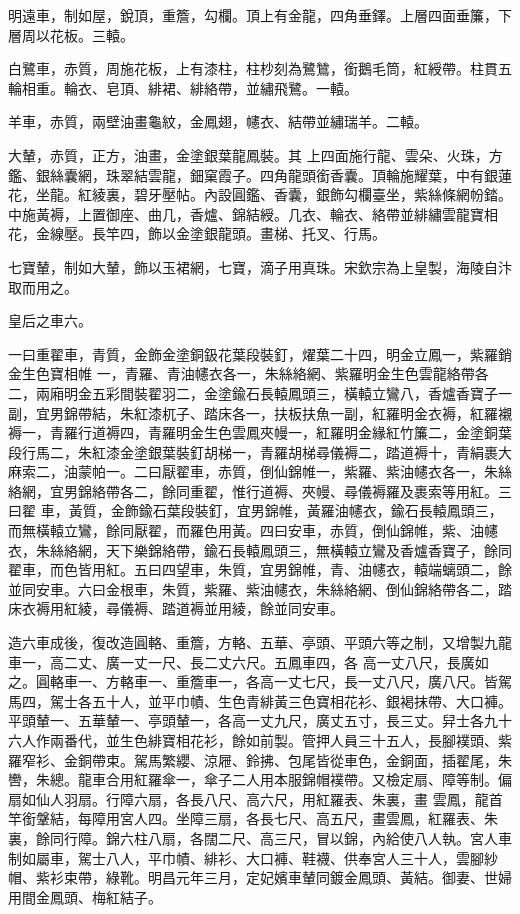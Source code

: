 \begin{pinyinscope}
 明遠車，制如屋，銳頂，重簷，勾欄。頂上有金龍，四角垂鐸。上層四面垂簾，下層周以花板。三轅。



 白鷺車，赤質，周施花板，上有漆柱，柱杪刻為鷺鷥，銜鵝毛筒，紅綬帶。柱貫五輪相重。輪衣、皂頂、緋裙、緋絡帶，並繡飛鷺。一轅。



 羊車，赤質，兩壁油畫龜紋，金鳳翅，幰衣、結帶並繡瑞羊。二轅。



 大輦，赤質，正方，油畫，金塗銀葉龍鳳裝。其
 上四面施行龍、雲朵、火珠，方鑑、銀絲囊網，珠翠結雲龍，鈿窠霞子。四角龍頭銜香囊。頂輪施耀葉，中有銀蓮花，坐龍。紅綾裏，碧牙壓帖。內設圓鑑、香囊，銀飾勾欄臺坐，紫絲條網帉錔。中施黃褥，上置御座、曲几，香爐、錦結綬。几衣、輪衣、絡帶並緋繡雲龍寶相花，金線壓。長竿四，飾以金塗銀龍頭。畫梯、托叉、行馬。



 七寶輦，制如大輦，飾以玉裙網，七寶，滴子用真珠。宋欽宗為上皇製，海陵自汴取而用之。



 皇后之車六。



 一曰重翟車，青質，金飾金塗銅鈒花葉段裝釘，燿葉二十四，明金立鳳一，紫羅銷金生色寶相帷
 一，青羅、青油幰衣各一，朱絲絡網、紫羅明金生色雲龍絡帶各二，兩廂明金五彩間裝翟羽二，金塗鍮石長轅鳳頭三，橫轅立鸞八，香爐香寶子一副，宜男錦帶結，朱紅漆杌子、踏床各一，扶板扶魚一副，紅羅明金衣褥，紅羅襯褥一，青羅行道褥四，青羅明金生色雲鳳夾幔一，紅羅明金緣紅竹簾二，金塗銅葉段行馬二，朱紅漆金塗銀葉裝釘胡梯一，青羅胡梯尋儀褥二，踏道褥十，青絹裹大麻索二，油蒙帕一。二曰厭翟車，赤質，倒仙錦帷一，紫羅、紫油幰衣各一，朱絲絡網，宜男錦絡帶各二，餘同重翟，惟行道褥、夾幔、尋儀褥羅及裹索等用紅。三曰翟
 車，黃質，金飾鍮石葉段裝釘，宜男錦帷，黃羅油幰衣，鍮石長轅鳳頭三，而無橫轅立鸞，餘同厭翟，而羅色用黃。四曰安車，赤質，倒仙錦帷，紫、油幰衣，朱絲絡網，天下樂錦絡帶，鍮石長轅鳳頭三，無橫轅立鸞及香爐香寶子，餘同翟車，而色皆用紅。五曰四望車，朱質，宜男錦帷，青、油幰衣，轅端螭頭二，餘並同安車。六曰金根車，朱質，紫羅、紫油幰衣，朱絲絡網、倒仙錦絡帶各二，踏床衣褥用紅綾，尋儀褥、踏道褥並用綾，餘並同安車。



 造六車成後，復改造圓輅、重簷，方輅、五華、亭頭、平頭六等之制，又增製九龍車一，高二丈、廣一丈一尺、長二丈六尺。五鳳車四，各
 高一丈八尺，長廣如之。圓輅車一、方輅車一、重簷車一，各高一丈七尺，長一丈八尺，廣八尺。皆駕馬四，駕士各五十人，並平巾幘、生色青緋黃三色寶相花衫、銀褐抹帶、大口褲。平頭輦一、五華輦一、亭頭輦一，各高一丈九尺，廣丈五寸，長三丈。舁士各九十六人作兩番代，並生色緋寶相花衫，餘如前製。管押人員三十五人，長腳襆頭、紫羅窄衫、金銅帶束。駕馬繁纓、涼屜、鈴拂、包尾皆從車色，金銅面，插翟尾，朱轡，朱總。龍車合用紅羅傘一，傘子二人用本服錦帽襆帶。又檢定扇、障等制。偏扇如仙人羽扇。行障六扇，各長八尺、高六尺，用紅羅表、朱裏，畫
 雲鳳，龍首竿銜鞶結，每障用宮人四。坐障三扇，各長七尺、高五尺，畫雲鳳，紅羅表、朱裏，餘同行障。錦六柱八扇，各闊二尺、高三尺，冒以錦，內給使八人執。宮人車制如屬車，駕士八人，平巾幘、緋衫、大口褲、鞋襪、供奉宮人三十人，雲腳紗帽、紫衫束帶，綠靴。明昌元年三月，定妃嬪車輦同鍍金鳳頭、黃結。御妻、世婦用間金鳳頭、梅紅結子。




\end{pinyinscope}
